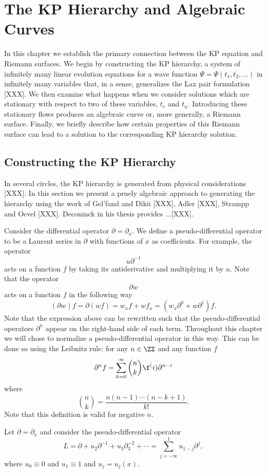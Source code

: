 \chapter{The KP Hierarchy and Algebraic Curves}

In this chapter we establish the primary connection between the KP equation and
Riemann surfaces. We begin by constructing the KP hierarchy, a system of
infinitely many linear evolution equations for a wave function $\Psi =
\Psi(t_1,t_2,\ldots)$ in infinitely many variables that, in a sense,
generalizes the Lax pair formulation [XXX]. We then examine what
happens when we consider solutions which are stationary with respect to two of
these variables, $t_r$ and $t_n$. Introducing these stationary flows produces
an algebraic curve or, more generally, a Riemann surface. Finally, we briefly
describe how certain properties of this Riemann surface can lead to a solution
to the corresponding KP hierarchy solution.

\section{Constructing the KP Hierarchy} \label{sec:2.1}

In several circles, the KP hierarchy is generated from physical considerations
[XXX]. In this section we present a pruely algebraic approach to generating the
hierarchy using the work of Gel'fand and Dikii [XXX], Adler [XXX], Strampp and
Oevel [XXX]. Deconinck in his thesis provides ...[XXX].

Consider the differential operator $\partial = \partial_x$. We define a
pseudo-differential operator to be a Laurent series in $\partial$ with
functions of $x$ as coefficients. For example, the operator
\begin{equation}
  u \partial^{-1}
\end{equation}
acts on a function $f$ by taking its antiderivative and multiplying it by
$u$. Note that the operator
\begin{equation}
  \partial w
\end{equation}
acts on a function $f$ in the following way
\begin{equation}
  (\partial w) f = \partial (w f) = w_x f + w f_x =
  (w_x \partial^0 + w \partial^1) f.
\end{equation}
Note that the expression above can be rewritten such that the
pseudo-differential operators $\partial^n$ appear on the right-hand side of
each term. Throughout this chapter we will chose to normalize a
pseudo-differential operator in this way. This can be done so using the
Leibnitz rule: for any $n \in \ZZ$ and any function $f$
\begin{equation} \label{eqn:leibnitz}
  \partial^n f = \sum_{k=0}^\infty \binom{n}{k} \f^(i)\partial^{n-i}
\end{equation}
where
\begin{equation}
  \binom{n}{k} = \frac{n(n-1) \cdots (n-k+1)}{k!}.
\end{equation}
Note that this definition is valid for negative $n$.

Let $\partial = \partial_x$ and
consider the pseudo-differential operator
\begin{equation}
  L
  =
  \partial + u_2 \partial^{-1} + u_3 \partial_3^{-2} + \cdots
  =
  \sum_{j=-\infty}^1 u_{1-j} \partial^j,
\end{equation}
where $u_0 \equiv 0$ and $u_1 \equiv 1$ and $u_j = u_j(x)$. 
